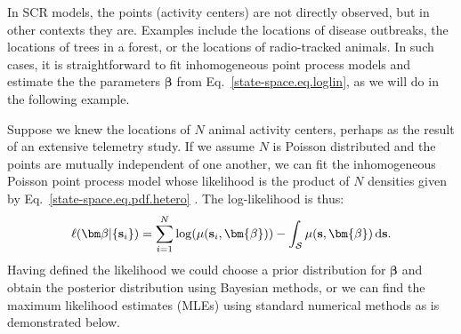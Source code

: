 In SCR models, the points (activity centers) are not directly
observed, but in other contexts they are. Examples include the
locations of disease outbreaks, the locations of trees in a forest, or
the locations of radio-tracked animals. In such cases, it is
straightforward to fit inhomogeneous point process models and estimate the
the parameters $\bm \beta$ from Eq.~\ref{state-space.eq.loglin}, as we
will do in the following example. %

Suppose we knew the locations of $N$ animal activity
centers, perhaps as the result of an extensive telemetry study. %
If we assume $N$ is Poisson distributed and the points are
mutually independent of one another, we can fit the
inhomogeneous Poisson point process model whose likelihood is
the product of $N$ densities given by
Eq.~\ref{state-space.eq.pdf.hetero} \citep[pg. 104]{diggle:2003}. The
log-likelihood is thus:
\[
\ell({\bm \beta} | \{{\bf s}_i\}) = \sum_{i=1}^N
\log(\mu(\mathbf{s}_i, \bm{\beta})) - \int_{\mathcal{S}} \mu(\mathbf{s}, \bm{\beta}) \, \mathrm{d} \mathbf{s} .
\]
Having defined the likelihood we could choose a prior distribution for
$\bm \beta$ and obtain the posterior distribution %
using Bayesian methods, or we can find the maximum likelihood
estimates (MLEs) using standard numerical methods as is demonstrated
below.


